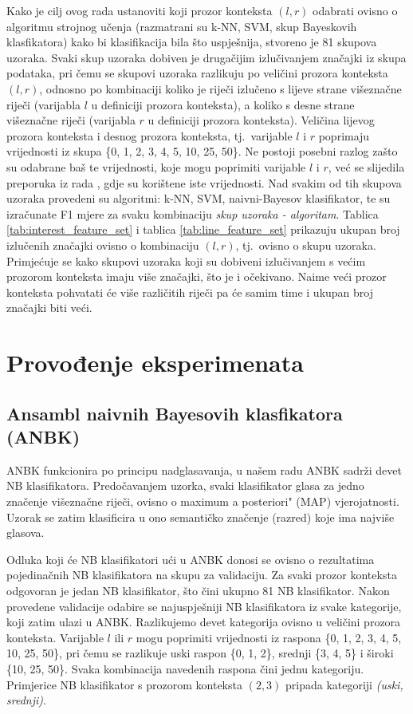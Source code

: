 \documentclass[10pt, a4paper]{article}
\begin{document}
Kako je cilj ovog rada ustanoviti koji prozor konteksta $(l,r)$ odabrati
ovisno o algoritmu strojnog učenja (razmatrani su k-NN, SVM, skup Bayeskovih klasfikatora)
kako bi klasifikacija bila što uspješnija, stvoreno je 81 skupova uzoraka. Svaki
skup uzoraka dobiven je drugačijim izlučivanjem značajki iz skupa podataka,
pri čemu se skupovi uzoraka razlikuju po veličini prozora konteksta $(l, r)$,
odnosno po kombinaciji koliko je riječi izlučeno s lijeve strane višeznačne riječi (varijabla $l$ u definiciji prozora konteksta), a koliko s desne strane višeznačne riječi (varijabla $r$ u definiciji prozora konteksta). Veličina lijevog prozora konteksta i desnog prozora konteksta, tj.~varijable
$l$ i $r$ poprimaju vrijednosti iz skupa \{0, 1, 2, 3, 4, 5, 10, 25, 50\}. Ne postoji posebni
razlog zašto su odabrane baš te vrijednosti, koje mogu poprimiti varijable $l$ i $r$,
već se slijedila preporuka iz rada \citep{pedersen}, gdje su korištene iste vrijednosti.
Nad svakim od tih skupova uzoraka provedeni su algoritmi: k-NN, SVM, naivni-Bayesov
klasifikator, te su izračunate F1 mjere za svaku kombinaciju \emph{skup uzoraka - algoritam}.
Tablica \ref{tab:interest_feature_set} i tablica \ref{tab:line_feature_set} prikazuju ukupan broj izlučenih značajki ovisno o kombinaciju $(l,r)$, tj.~ovisno o skupu uzoraka. Primjećuje
se kako skupovi uzoraka koji su dobiveni izlučivanjem s većim prozorom konteksta imaju
više značajki, što je i očekivano. Naime veći prozor konteksta pohvatati će više 
različitih riječi pa će samim time i ukupan broj značajki biti veći.

\section{Provođenje eksperimenata}
\subsection{Ansambl naivnih Bayesovih klasfikatora (ANBK)}
ANBK funkcionira po principu nadglasavanja, u našem radu ANBK sadrži devet NB klasifikatora.
Predočavanjem uzorka, svaki klasifikator glasa za jedno značenje višeznačne riječi, 
ovisno o \glqq maximum a posteriori" (MAP) vjerojatnosti. Uzorak se 
zatim klasificira u ono semantičko značenje (razred) koje ima najviše glasova.

Odluka koji će NB klasifikatori ući u ANBK donosi se ovisno o rezultatima pojedinačnih
NB klasifikatora na skupu za validaciju.
Za svaki prozor konteksta odgovoran je jedan
NB klasifikator, što čini ukupno 81 NB klasifikator. 
Nakon provedene validacije odabire se najuspješniji NB klasifikatora
iz svake kategorije, koji zatim ulazi u ANBK. 
Razlikujemo devet kategorija ovisno u veličini prozora konteksta.
Varijable $l$ ili $r$ mogu poprimiti vrijednosti iz raspona \{0, 1, 2, 3, 4, 5, 10, 25, 50\},
pri čemu se razlikuje uski raspon \{0, 1, 2\}, srednji \{3, 4, 5\} i široki \{10, 25, 50\}.
Svaka kombinacija navedenih raspona čini jednu kategoriju. Primjerice
NB klasifikator s prozorom konteksta $(2,3)$ pripada kategoriji \emph{(uski, srednji)}.
\end{document}
